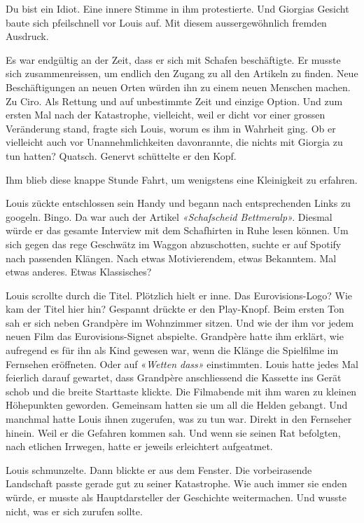 Du bist ein Idiot. Eine innere Stimme in ihm protestierte. Und Giorgias
Gesicht baute sich pfeilschnell vor Louis auf. Mit diesem
aussergewöhnlich fremden Ausdruck.

Es war endgültig an der Zeit, dass er sich mit Schafen beschäftigte. Er
musste sich zusammenreissen, um endlich den Zugang zu all den Artikeln
zu finden. Neue Beschäftigungen an neuen Orten würden ihn zu einem neuen
Menschen machen. Zu Ciro. Als Rettung und auf unbestimmte Zeit und
einzige Option. Und zum ersten Mal nach der Katastrophe, vielleicht,
weil er dicht vor einer grossen Veränderung stand, fragte sich Louis,
worum es ihm in Wahrheit ging. Ob er vielleicht auch vor
Unannehmlichkeiten davonrannte, die nichts mit Giorgia zu tun hatten?
Quatsch. Genervt schüttelte er den Kopf.

Ihm blieb diese knappe Stunde Fahrt, um wenigstens eine Kleinigkeit zu
erfahren.

Louis zückte entschlossen sein Handy und begann nach entsprechenden
Links zu googeln. Bingo. Da war auch der Artikel \emph{«Schafscheid
Bettmeralp».} Diesmal würde er das gesamte Interview mit dem Schafhirten
in Ruhe lesen können. Um sich gegen das rege Geschwätz im Waggon
abzuschotten, suchte er auf Spotify nach passenden Klängen. Nach etwas
Motivierendem, etwas Bekanntem. Mal etwas anderes. Etwas Klassisches?

Louis scrollte durch die Titel. Plötzlich hielt er inne. Das
Eurovisions-Logo? Wie kam der Titel hier hin? Gespannt drückte er den
Play-Knopf. Beim ersten Ton sah er sich neben Grandpère im Wohnzimmer
sitzen. Und wie der ihm vor jedem neuen Film das Eurovisions-Signet
abspielte. Grandpère hatte ihm erklärt, wie aufregend es für ihn als
Kind gewesen war, wenn die Klänge die Spielfilme im Fernsehen
eröffneten. Oder auf «\emph{Wetten dass»} einstimmten\emph{.} Louis
hatte jedes Mal feierlich darauf gewartet, dass Grandpère anschliessend
die Kassette ins Gerät schob und die breite Starttaste klickte. Die
Filmabende mit ihm waren zu kleinen Höhepunkten geworden. Gemeinsam
hatten sie um all die Helden gebangt. Und manchmal hatte Louis ihnen
zugerufen, was zu tun war. Direkt in den Fernseher hinein. Weil er die
Gefahren kommen sah. Und wenn sie seinen Rat befolgten, nach etlichen
Irrwegen, hatte er jeweils erleichtert aufgeatmet.

Louis schmunzelte. Dann blickte er aus dem Fenster. Die vorbeirasende
Landschaft passte gerade gut zu seiner Katastrophe. Wie auch immer sie
enden würde, er musste als Hauptdarsteller der Geschichte weitermachen.
Und wusste nicht, was er sich zurufen sollte.

